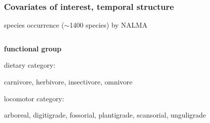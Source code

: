 \documentclass{beamer}
\begin{document}
\begin{frame}
  \frametitle{Covariates of interest, temporal structure}

  \begin{center}
    \large{species occurrence (\(\sim\)1400 species) by NALMA}
  \end{center}

  \vspace*{0.05\textheight}

  \begin{columns}
    \begin{column}[T]{0.5\textwidth}
      \textbf{functional group}
      \begin{itemize}
        \small{
        \item dietary category: \\\begin{tiny}carnivore, herbivore, insectivore, omnivore\end{tiny}
        \item locomotor category: \\\begin{tiny}arboreal, digitigrade, fossorial, plantigrade, scansorial, unguligrade\end{tiny}
        }
      \end{itemize}
  
      \vspace*{0.01\textheight}


\end{column}
\end{columns}
\end{frame}
\end{document}
